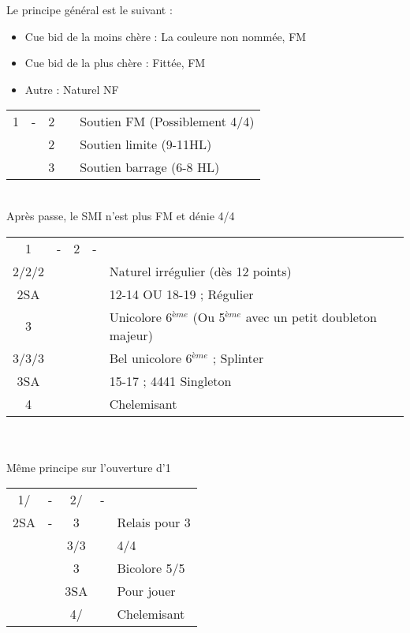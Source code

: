 \documentclass[a4paper, oneside, 11pt]{report}
\begin{document}
		Le principe général est le suivant :
		\begin{itemize}
		\item Cue bid de la moins chère : La couleure non nommée, FM
		\item Cue bid de la plus chère : Fittée, FM
		\item Autre : Naturel NF\\
		\end{itemize}
		
		\begin{tabular}{cccc|l}
		1\trefle & - & 2\trefle && Soutien FM (Possiblement 4\coeur/4\pique)\\	
		&& 2\carreau && Soutien limite (9-11HL)\\
		&& 3\trefle && Soutien barrage (6-8 HL)\\
		\end{tabular}\\
		Après passe, le SMI n'est plus FM et dénie 4\coeur/4\pique\\
	
		\begin{tabular}{cccc|l}
		1\trefle & - & 2\trefle & - &\\
		2\carreau/2\coeur/2\pique &&&& Naturel irrégulier (dès 12 points)\\
		2SA &&&& 12-14 OU 18-19 ; Régulier\\
		3\trefle &&&& Unicolore 6$^{ème}$ (Ou 5$^{ème}$ avec un petit doubleton majeur)\\
		3\carreau/3\coeur/3\pique &&&& Bel unicolore 6$^{ème}$ ; Splinter\\
		3SA &&&& 15-17 ; 4441 Singleton \carreau\\
		4\trefle &&&& Chelemisant \trefle\\
		\end{tabular}\\\\

		Même principe sur l'ouverture d'1\carreau\\

		\begin{tabular}{cccc|l}
		1\trefle/\carreau & - & 2\trefle/\carreau & - &\\
		2SA & - & 3\trefle && Relais pour 3\carreau\\
		&& 3\carreau/3\coeur && 4\coeur/4\pique\\
		&& 3\pique && Bicolore 5\trefle/5\carreau\\
		&& 3SA && Pour jouer\\
		&& 4\trefle/\carreau && Chelemisant\\
		\end{tabular}\\\\
\end{document}
